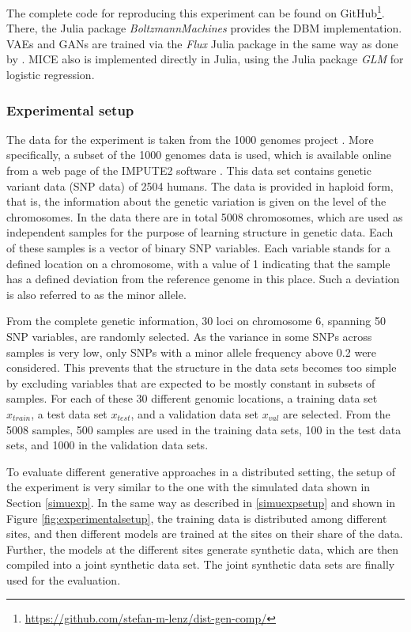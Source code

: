\documentclass[12pt]{article}
\newcommand{\apkg}[1]{\emph{#1}}
\begin{document}
The complete code for reproducing this experiment can be found on GitHub\footnote{\url{https://github.com/stefan-m-lenz/dist-gen-comp/}}.
There, the Julia package \apkg{BoltzmannMachines} provides the DBM implementation.
VAEs and GANs are trained via the \apkg{Flux} Julia package in the same way as done by \cite{nussberger_synthetic_2020}. MICE also is implemented directly in Julia, using the Julia package \apkg{GLM} \citep{juliaglm} for logistic regression.

\subsubsection{Experimental setup}\label{realexpsetup}

The data for the experiment is taken from the 1000 genomes project \citep{1000genomes}.
More specifically, a subset of the 1000 genomes data is used, which is available online from a web page \citep{impute_1000_genomes} of the IMPUTE2 software \citep{impute2}.
This data set contains genetic variant data (SNP data) of 2504 humans.
The data is provided in haploid form, that is, the information about the genetic variation is given on the level of the chromosomes.
In the data there are in total 5008 chromosomes, which are used as independent samples for the purpose of learning structure in genetic data.
Each of these samples is a vector of binary SNP variables.
Each variable stands for a defined location on a chromosome, with a value of 1 indicating that the sample has a defined deviation from the reference genome in this place.
Such a deviation is also referred to as the minor allele.

From the complete genetic information, 30 loci on chromosome 6, spanning 50 SNP variables, are randomly selected.
As the variance in some SNPs across samples is very low, only SNPs with a minor allele frequency above 0.2 were considered.
This prevents that the structure in the data sets becomes too simple by excluding variables that are expected to be mostly constant in subsets of samples.
For each of these 30 different genomic locations, a training data set $x_{train}$, a test data set $x_{test}$, and a validation data set $x_{val}$ are selected.
From the 5008 samples, 500 samples are used in the training data sets, 100 in the test data sets, and 1000 in the validation data sets.

To evaluate different generative approaches in a distributed setting,
the setup of the experiment is very similar to the one with the simulated data shown in Section \ref{simuexp}.
In the same way as described in \ref{simuexpsetup} and shown in Figure \ref{fig:experimentalsetup},
the training data is distributed among different sites, and then different models are trained at the sites on their share of the data.
Further, the models at the different sites generate synthetic data, which are then compiled into a joint synthetic data set.
The joint synthetic data sets are finally used for the evaluation.
\end{document}
